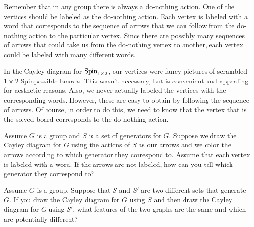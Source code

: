 Remember that in any group there is always a do-nothing action.  One of the vertices should be labeled as the do-nothing action.  Each vertex is labeled with a word that corresponds to the sequence of arrows that we can follow from the do-nothing action to the particular vertex.  Since there are possibly many sequences of arrows that could take us from the do-nothing vertex to another, each vertex could be labeled with many different words.

In the Cayley diagram for $\operatorname{Spin}_{1\times 2}$, our vertices were fancy pictures of scrambled $1\times 2$ Spinpossible boards.  This wasn't necessary, but is convenient and appealing for aesthetic reasons.  Also, we never actually labeled the vertices with the corresponding words.  However, these are easy to obtain by following the sequence of arrows.  Of course, in order to do this, we need to know that the vertex that is the solved board corresponds to the do-nothing action.

\begin{exercise}
Assume $G$ is a group and $S$ is a set of generators for $G$. Suppose we draw the Cayley diagram for $G$ using the actions of $S$ as our arrows and we color the arrows according to which generator they correspond to.  Assume that each vertex is labeled with a word.  If the arrows are not labeled, how can you tell which generator they correspond to?
\end{exercise}

\begin{exercise}
Assume $G$ is a group.  Suppose that $S$ and $S'$ are two different sets that generate $G$.  If you draw the Cayley diagram for $G$ using $S$ and then draw the Cayley diagram for $G$ using $S'$, what features of the two graphs are the same and which are potentially different?
\end{exercise}
